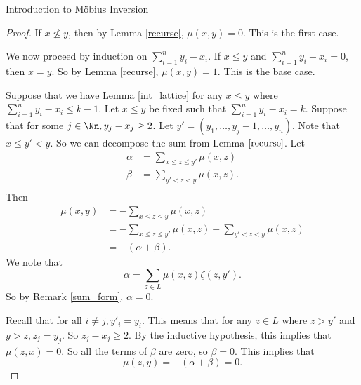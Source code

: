 \documentclass[12pt]{pom_thesis}
\begin{document}
\begin{chapter}{Introduction to M\"obius Inversion}
\begin{proof}
If $x \nleq y$, then by Lemma \ref{recurse}, $\mu(x,y) = 0$. This is the first case.

We now proceed by induction on $\sum_{i=1}^ny_i-x_i$. If $x \leq y$ and $\sum_{i=1}^ny_i-x_i = 0$, then $x = y$. So by Lemma \ref{recurse}, $\mu(x,y) = 1$. This is the base case.

Suppose that we have Lemma \ref{int_lattice} for any $x \leq y$ where $\sum_{i=1}^ny_i-x_i \leq k-1$. Let $x \leq y$ be fixed such that $\sum_{i=1}^ny_i-x_i =k$. Suppose that for some $j \in \Nn, y_j-x_j \geq 2$. Let $y' = (y_1,\dots,y_j-1,\dots,y_n)$. Note that $x \leq y' < y$. So we can decompose the sum from Lemma $\ref{recurse}$. Let
\begin{align*}
\alpha &= \sum_{x \leq z \leq y'} \mu(x,z)\\
\beta &= \sum_{y' < z < y}\mu(x,z).\\
\end{align*}
Then
\begin{align*}
\mu(x,y) &= -\sum_{x \leq z \leq y}\mu(x,z)\\
&= -\sum_{x \leq z \leq y'} \mu(x,z) - \sum_{y' < z < y}\mu(x,z)\\
&= -(\alpha + \beta).
\end{align*}
We note that
\[\alpha = \sum_{z \in L} \mu(x,z)\zeta(z,y').
\]
So by Remark \ref{sum_form}, $\alpha=0$. 

Recall that for all $i \neq j, y'_i = y_i$. This means that for any $z \in L$ where $z>y'$ and $y > z, z_j = y_j$. So $z_j-x_j \geq 2$. By the inductive hypothesis, this implies that $\mu(z,x)=0$. So all the terms of $\beta$ are zero, so $\beta=0$. This implies that \[\mu(z,y)=-(\alpha+\beta)=0.\]


\end{proof}
\end{chapter}
\end{document}
